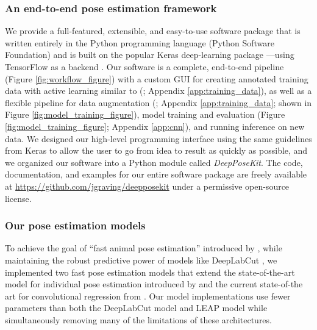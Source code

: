 \documentclass[11pt,a4paper,oneside]{article}
\begin{document}
\subsubsection{An end-to-end pose estimation framework}
We provide a full-featured, extensible, and easy-to-use software package that is written entirely in the Python programming language (Python Software Foundation) and is built on the popular Keras deep-learning package \citep{chollet2015keras}—using TensorFlow as a backend \citep{tensorflow2015-whitepaper}. Our software is a complete, end-to-end pipeline (Figure \ref{fig:workflow_figure}) with a custom GUI for creating annotated training data with active learning similar to \citeauthor{pereira2019fast} (\citeyear{pereira2019fast}; Appendix \ref{app:training_data}), as well as a flexible pipeline for data augmentation (\citealt{jung2018imgaug}; Appendix \ref{app:training_data}; shown in Figure \ref{fig:model_training_figure}), model training and evaluation (Figure \ref{fig:model_training_figure}; Appendix \ref{app:cnn}), and running inference on new data. We designed our high-level programming interface using the same guidelines from Keras \citep{chollet2015keras} to allow the user to go from idea to result as quickly as possible, and we organized our software into a Python module called \textit{DeepPoseKit}. The code, documentation, and examples for our entire software package are freely available at \url{https://github.com/jgraving/deepposekit} under a permissive open-source license. 


\subsubsection{Our pose estimation models}
To achieve the goal of “fast animal pose estimation” introduced by \cite{pereira2019fast}, while maintaining the robust predictive power of models like DeepLabCut \citep{mathis2018deeplabcut}, we implemented two fast pose estimation models that extend the state-of-the-art model for individual pose estimation introduced by \cite{newell2016} and the current state-of-the art for convolutional regression from \cite{Jegou16}. Our model implementations use fewer parameters than both the DeepLabCut model \citep{mathis2018deeplabcut} and LEAP model \citep{pereira2019fast} while simultaneously removing many of the limitations of these architectures. 
\end{document}
